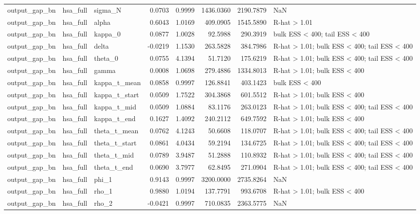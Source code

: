 \begin{tabular}{lllrrrrl}
output\_gap\_bn & hsa\_full & sigma\_N & 0.0703 & 0.9999 & 1436.0360 & 2190.7879 & NaN \\
output\_gap\_bn & hsa\_full & alpha & 0.6043 & 1.0169 & 409.0905 & 1545.5890 & R-hat > 1.01 \\
output\_gap\_bn & hsa\_full & kappa\_0 & 0.0877 & 1.0028 & 92.5988 & 290.3919 & bulk ESS < 400; tail ESS < 400 \\
output\_gap\_bn & hsa\_full & delta & -0.0219 & 1.1530 & 263.5828 & 384.7986 & R-hat > 1.01; bulk ESS < 400; tail ESS < 400 \\
output\_gap\_bn & hsa\_full & theta\_0 & 0.0755 & 4.1394 & 51.7120 & 175.6219 & R-hat > 1.01; bulk ESS < 400; tail ESS < 400 \\
output\_gap\_bn & hsa\_full & gamma & 0.0008 & 1.0698 & 279.4886 & 1334.8013 & R-hat > 1.01; bulk ESS < 400 \\
output\_gap\_bn & hsa\_full & kappa\_t\_mean & 0.0858 & 0.9997 & 126.8841 & 403.1423 & bulk ESS < 400 \\
output\_gap\_bn & hsa\_full & kappa\_t\_start & 0.0509 & 1.7522 & 304.3868 & 601.5512 & R-hat > 1.01; bulk ESS < 400 \\
output\_gap\_bn & hsa\_full & kappa\_t\_mid & 0.0509 & 1.0884 & 83.1176 & 263.0123 & R-hat > 1.01; bulk ESS < 400; tail ESS < 400 \\
output\_gap\_bn & hsa\_full & kappa\_t\_end & 0.1627 & 1.4092 & 240.2112 & 649.7592 & R-hat > 1.01; bulk ESS < 400 \\
output\_gap\_bn & hsa\_full & theta\_t\_mean & 0.0762 & 4.1243 & 50.6608 & 118.0707 & R-hat > 1.01; bulk ESS < 400; tail ESS < 400 \\
output\_gap\_bn & hsa\_full & theta\_t\_start & 0.0861 & 4.0434 & 59.2194 & 134.6725 & R-hat > 1.01; bulk ESS < 400; tail ESS < 400 \\
output\_gap\_bn & hsa\_full & theta\_t\_mid & 0.0789 & 3.9487 & 51.2888 & 110.8932 & R-hat > 1.01; bulk ESS < 400; tail ESS < 400 \\
output\_gap\_bn & hsa\_full & theta\_t\_end & 0.0690 & 3.7977 & 62.8495 & 271.0904 & R-hat > 1.01; bulk ESS < 400; tail ESS < 400 \\
output\_gap\_bn & hsa\_full & phi\_1 & 0.9143 & 0.9997 & 3200.0000 & 2735.8264 & NaN \\
output\_gap\_bn & hsa\_full & rho\_1 & 0.9880 & 1.0194 & 137.7791 & 993.6708 & R-hat > 1.01; bulk ESS < 400 \\
output\_gap\_bn & hsa\_full & rho\_2 & -0.0421 & 0.9997 & 710.0835 & 2363.5775 & NaN \\

\end{tabular}
